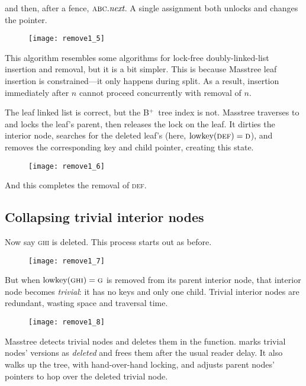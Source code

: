 \documentclass[11pt]{article}
\newcommand{\V}[1]{\textit{#1}}
\newcommand{\N}[1]{\text{\upshape{#1}}}
\newcommand{\Bplus}{B\(^+\)}
\newcommand{\ITEM}[1]{\textsc{#1}}
\begin{document}
\noindent%
and then, after a fence, \(\ITEM{abc}.\V{next}\). A single assignment
both unlocks and changes the pointer.

\begin{figure}[H]
\texttt{[image: remove1\_5]}
\end{figure}

\noindent%
This algorithm resembles some algorithms for lock-free
doubly-linked-list insertion and removal, but it is a bit simpler. This
is because Masstree leaf insertion is constrained---it only happens
during split. As a result, insertion immediately after \(n\) cannot
proceed concurrently with removal of \(n\).

The leaf linked list is correct, but the \Bplus\ tree index is not.
Masstree traverses to and locks the leaf's parent, then releases the
lock on the leaf. It dirties the interior node, searches for the deleted
leaf's \N{lowkey} (here, \(\N{lowkey}(\ITEM{def}) = \ITEM{d}\)), and removes
the corresponding key and child pointer, creating this state.

\begin{figure}[H]
\texttt{[image: remove1\_6]}
\end{figure}

And this completes the removal of \ITEM{def}.

\subsection{Collapsing trivial interior nodes}

Now say \ITEM{ghi} is deleted. This process starts out as before.

\begin{figure}[H]
\texttt{[image: remove1\_7]}
\end{figure}

\noindent%
But when \(\N{lowkey}(\ITEM{ghi}) = \ITEM{g}\) is removed from its
parent interior node, that interior node becomes \emph{trivial}: it has
no keys and only one child. Trivial interior nodes are redundant,
wasting space and traversal time.

\begin{figure}[H]
\texttt{[image: remove1\_8]}
\end{figure}

Masstree detects trivial nodes and deletes them in the \N{collapse}
function. \N{Collapse} marks trivial nodes' versions as \V{deleted} and
frees them after the usual reader delay. It also walks up the tree, with
hand-over-hand locking, and adjusts parent nodes' pointers to hop over
the deleted trivial node.
\end{document}
